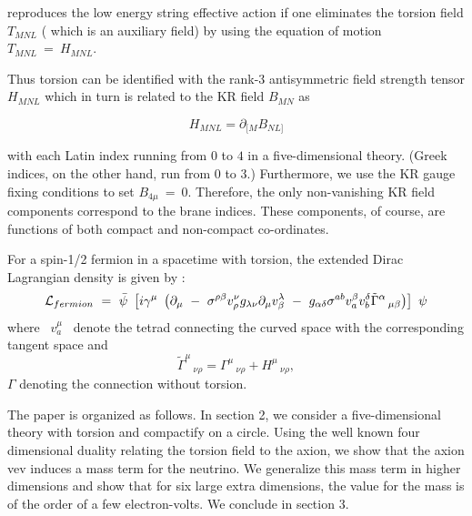 \documentclass[a4paper,12pt]{article}
\begin{document}
\noindent reproduces the low energy string effective action if
one eliminates the torsion field $ T_{MNL}$ ( which is an
auxiliary field) by using the equation of motion $ T_{MNL} ~=~
H_{MNL}$.


Thus torsion can be identified with the rank-3 antisymmetric
field strength tensor $H_{MNL}$ which in turn is related to the
KR field $B_{MN}$\cite{kr} as

\begin{equation}
H_{MNL} = \partial_{[M}B_{NL]}
\end{equation}




\noindent with each Latin index running from $0$ to $4$ in a
five-dimensional theory. (Greek indices, on the other hand, run
from 0 to 3.) Furthermore, we use the KR gauge fixing conditions
to set $B_{4\mu}~=~0$. Therefore, the only non-vanishing KR field
components correspond to the brane indices. These components, of
course, are functions of both compact and non-compact
co-ordinates.


For a spin-1/2 fermion in a spacetime with torsion, the extended
Dirac Lagrangian density is given by \cite{aud,fig}:
\begin{equation} {\cal L}_{fermion} ~=~ \bar{\psi}~\left[i
\gamma^{\mu}~\left(
\partial_{\mu} ~-~ \sigma^{\rho \beta} v^{\nu}_{\rho} g_{\lambda
\nu} \partial_{\mu} v^{\lambda}_{\beta} ~-~ g_{\alpha \delta}
\sigma^{a b} v^{\beta}_a v^{\delta}_b \tilde{\Gamma}^{\alpha}\,
_{\mu \beta} \right) \right]~\psi \end{equation} where
~$v^{\mu}_a$~ denote the tetrad connecting the curved space with
the corresponding tangent space and
\begin{equation}
\tilde{\Gamma}^{\mu}\,_{\nu\rho}=\Gamma^{\mu}\,_{\nu\rho}+H^{\mu}\,_{\nu\rho},
\end{equation}
$\Gamma$ denoting the connection without torsion.

The paper is organized as follows. In section 2, we consider a
five-dimensional theory with torsion and compactify on a circle.
Using the well known four dimensional duality relating the
torsion field to the axion, we show that the axion vev induces a
mass term for the neutrino. We generalize this mass term in
higher dimensions and show that for six large extra dimensions,
the value for the mass is of the order of a few electron-volts.
We conclude in section 3.
\end{document}
